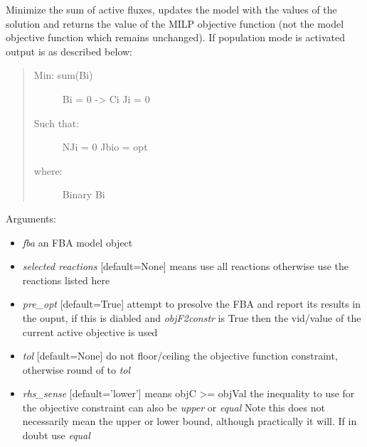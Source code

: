 \documentclass[a4paper,11pt,english]{sphinxmanual}
\begin{document}
\begin{fulllineitems}
\label{modules_doc:cbmpy.CBCPLEX.cplx_MinimizeNumActiveFluxes}
Minimize the sum of active fluxes, updates the model with the values of the solution and returns the value
of the MILP objective function (not the model objective function which remains unchanged). If population mode is activated
output is as described below:
\begin{quote}
\begin{description}
\item[{Min: sum(Bi)}] \leavevmode
Bi = 0 -\textgreater{} Ci Ji = 0

\item[{Such that:}] \leavevmode
NJi = 0
Jbio = opt

\item[{where:}] \leavevmode
Binary Bi

\end{description}
\end{quote}

Arguments:
\begin{itemize}
\item {} 
\emph{fba} an FBA model object

\item {} 
\emph{selected reactions} {[}default=None{]} means use all reactions otherwise use the reactions listed here

\item {} 
\emph{pre\_opt} {[}default=True{]} attempt to presolve the FBA and report its results in the ouput, if this is diabled and \emph{objF2constr} is True then the vid/value of the current active objective is used

\item {} 
\emph{tol}  {[}default=None{]} do not floor/ceiling the objective function constraint, otherwise round of to \emph{tol}

\item {} 
\emph{rhs\_sense} {[}default='lower'{]} means objC \textgreater{}= objVal the inequality to use for the objective constraint can also be \emph{upper} or \emph{equal}
Note this does not necessarily mean the upper or lower bound, although practically it will. If in doubt use \emph{equal}


\end{itemize}
\end{fulllineitems}
\end{document}

